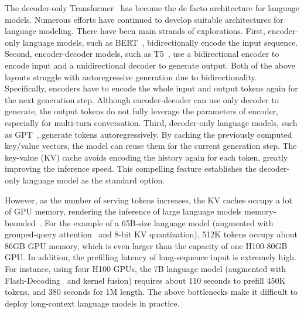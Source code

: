 The decoder-only Transformer~\cite{transformer} has become the de facto architecture for language models.
Numerous efforts have continued to develop suitable architectures for language modeling.
There have been main strands of explorations.
First, encoder-only language models, such as BERT~\cite{bert}, bidirectionally encode the input sequence.
Second, encoder-decoder models, such as T5~\cite{t5}, use a bidirectional encoder to encode input and a unidirectional decoder to generate output.
Both of the above layouts struggle with autoregressive generation due to bidirectionality.
Specifically, encoders have to encode the whole input and output tokens again for the next generation step.
Although encoder-decoder can use only decoder to generate, the output tokens do not fully leverage the parameters of encoder, especially for multi-turn conversation.
Third, decoder-only language models, such as GPT~\cite{gpt3}, generate tokens autoregressively.
By caching the previously computed key/value vectors, the model can reuse them for the current generation step.
The key-value (KV) cache avoids encoding the history again for each token, greatly improving the inference speed.
This compelling feature establishes the decoder-only language model as the standard option.

However, as the number of serving tokens increases, the KV caches occupy a lot of GPU memory, rendering the inference of large language models memory-bounded~\cite{scaling:inference}.
For the example of a 65B-size language model (augmented with grouped-query attention~\cite{gqa} and 8-bit KV quantization), 512K tokens occupy about 86GB GPU memory, which is even larger than the capacity of one H100-80GB GPU.
In addition, the prefilling latency of long-sequence input is extremely high.
For instance, using four H100 GPUs, the 7B language model (augmented with Flash-Decoding~\cite{flashdec} and kernel fusion) requires about 110 seconds to prefill 450K tokens, and 380 seconds for 1M length.
The above bottlenecks make it difficult to deploy long-context language models in practice.

